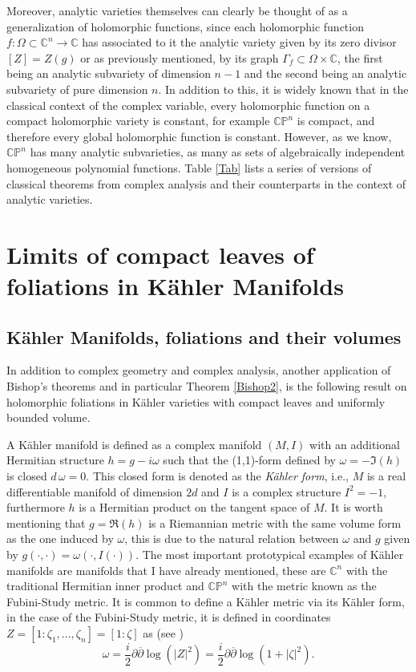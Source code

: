 \documentclass[12pt,twoside,a4paper]{report}
\newcommand{\co}{\ensuremath{\mathbb C }}
\newcommand{\con}{\ensuremath{\mathbb{C}^n}}
\newcommand{\cp}{\ensuremath{\mathbb{CP}}}
\begin{document}
Moreover, analytic varieties themselves can clearly be thought of as a generalization of holomorphic functions,
since each holomorphic function $f:\Omega\subset\con\rightarrow\co$ has associated to it the analytic variety given by its zero divisor $[Z]=Z(g)$
or as previously mentioned, by its graph $\Gamma_{f}\subset\Omega\times\co$, the first being an analytic subvariety of
dimension $n-1$ and the second being
an analytic subvariety of pure dimension $n$. In addition to this, it is widely known that in the classical context
of the complex variable, every holomorphic function on a compact holomorphic variety is constant, for example $\cp^n$ is compact,
and therefore every global holomorphic function is constant. However, as we know, $\cp^n$ has many analytic subvarieties, as many
as sets of algebraically independent homogeneous polynomial functions. Table \ref{Tab} lists a series of
versions of classical theorems from complex analysis and their counterparts in the context of analytic varieties.

\section{Limits of compact leaves of foliations in K\"ahler Manifolds}
\subsection{K\"ahler Manifolds, foliations and their volumes}
\noindent In addition to complex geometry and complex analysis, another application of Bishop's theorems and in particular Theorem
\ref{Bishop2}, is the following result on holomorphic foliations in K\"ahler varieties with compact leaves and uniformly bounded volume.

A K\"ahler manifold is defined as a complex manifold $(M,I)$ with an additional Hermitian structure $h=g-i\omega$ such that the (1,1)-form defined by $\omega=-\Im (h)$ is closed $d\,\omega=0$. This closed form is denoted as the \emph{K\"ahler form}, i.e., $M$ is a real differentiable manifold of dimension $2d$ and
$I$ is a complex structure $I^2=-1$, furthermore $h$ is a Hermitian product on the tangent space of $M$.
It is worth mentioning that $g=\Re (h)$ is a Riemannian metric with the same volume form as the one induced by $\omega$, this is due to the natural relation between $\omega$ and $g$ given by $g(\cdot,\cdot)=\omega(\cdot,I(\cdot))$. The most important prototypical examples of K\"ahler manifolds are manifolds that I have already mentioned, these are $\con$ with the traditional Hermitian inner product and $\cp^{n}$ with the metric known as the Fubini-Study metric.
It is common to define a K\"ahler metric via its K\"ahler form, in the case of the Fubini-Study metric, it is defined in coordinates $Z=[1:\zeta_{1},\dots,\zeta_{n}]=[1:\zeta]$ as (see \cite[p. 154]{Chirka})
\[
    \omega=\frac{i}{2}\partial\overline{\partial}\log(|Z|^{2})=\frac{i}{2}\partial\overline{\partial}\log(1+|\zeta|^{2}).
\]
\end{document}
